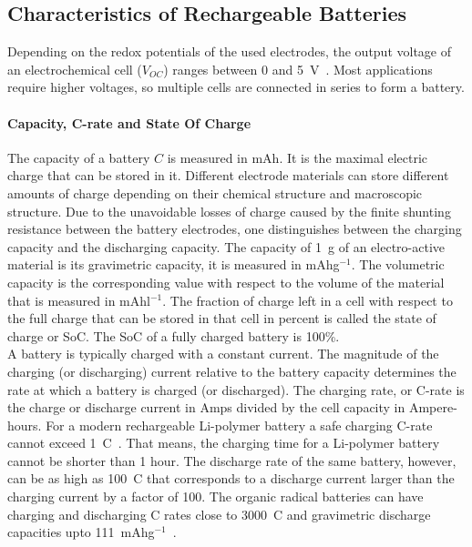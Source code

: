 
\subsection{Characteristics of Rechargeable Batteries}
Depending on the redox potentials of the used electrodes, the output voltage of an electrochemical cell ($V_{OC}$) ranges between 0 and 5~V~\cite{janoschka2012_advmater}. Most applications require higher voltages, so multiple cells are connected in series to form a battery. %

\paragraph{Capacity, C-rate and State Of Charge}
The capacity of a battery $C$ is measured in mAh. It is the maximal electric charge that can be stored in it. Different electrode materials can store different amounts of charge depending on their chemical structure and macroscopic structure. Due to the unavoidable losses of charge caused by the finite shunting resistance between the battery electrodes, one distinguishes between the charging capacity and the discharging capacity. The capacity of 1~g of an electro-active material is its gravimetric capacity, it is measured in mAhg$^{-1}$. The volumetric capacity is the corresponding value with respect to the volume of the material that is measured in mAhl$^{-1}$. The fraction of charge left in a cell with respect to the full charge that can be stored in that cell in percent is called the state of charge or SoC. The SoC of a fully charged battery is 100\%.\\
A battery is typically charged with a constant current. The magnitude of the charging (or discharging) current relative to the battery capacity determines the rate at which a battery is charged (or discharged). The charging rate, or C-rate is the charge or discharge current in Amps divided by the cell capacity in Ampere-hours. For a modern rechargeable Li-polymer battery a safe charging C-rate cannot exceed 1~C~\cite{Zhang2022}. That means, the charging time for a Li-polymer battery cannot be shorter than 1 hour. The discharge rate of the same battery, however, can be as high as 100~C that corresponds to a discharge current larger than the charging current by a factor of 100. The organic radical batteries can have charging and discharging C rates close to 3000~C and gravimetric discharge capacities upto 111~mAhg$^{-1}$~\cite{Vereshchagin2020,friebe2017_topcurrchem,Zens2022,Vereshchagin2022,Kulikov2023}.

